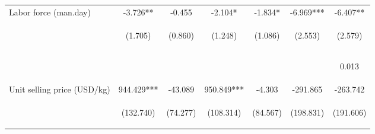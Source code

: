 \begin{center}
\begin{tabular}{lcccccc}
Labor force (man.day) & -3.726** & -0.455 & -2.104* & -1.834* & -6.969*** & -6.407** \\
 & \begin{footnotesize}(1.705)\end{footnotesize} & \begin{footnotesize}(0.860)\end{footnotesize} & \begin{footnotesize}(1.248)\end{footnotesize} & \begin{footnotesize}(1.086)\end{footnotesize} & \begin{footnotesize}(2.553)\end{footnotesize} & \begin{footnotesize}(2.579)\end{footnotesize} \\
\vspace{4pt} & \begin{footnotesize}[0.029]\end{footnotesize} & \begin{footnotesize}[0.596]\end{footnotesize} & \begin{footnotesize}[0.092]\end{footnotesize} & \begin{footnotesize}[0.091]\end{footnotesize} & \begin{footnotesize}[0.006]\end{footnotesize} & \begin{footnotesize}0.013\end{footnotesize} \\
Unit selling price (USD/kg) & 944.429*** & -43.089 & 950.849*** & -4.303 & -291.865 & -263.742 \\
 & \begin{footnotesize}(132.740)\end{footnotesize} & \begin{footnotesize}(74.277)\end{footnotesize} & \begin{footnotesize}(108.314)\end{footnotesize} & \begin{footnotesize}(84.567)\end{footnotesize} & \begin{footnotesize}(198.831)\end{footnotesize} & \begin{footnotesize}(191.606)\end{footnotesize} \\

\end{tabular}
\end{center}
